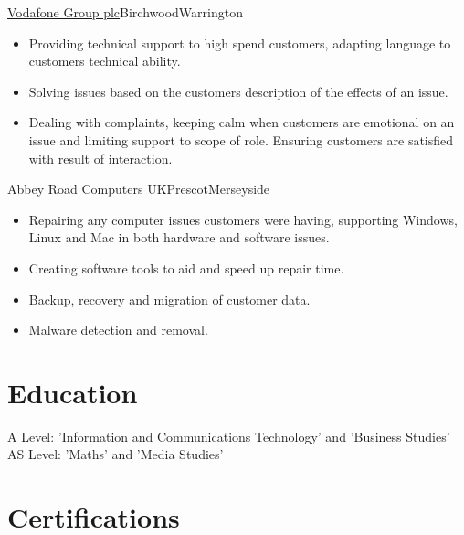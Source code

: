 \documentclass[a4paper,10pt]{moderncv}
\newcommand\weblink[2] {{\color{href} \href{#1}{#2}}}
\begin{document}
{\weblink{http://www.vodafone.com/}{Vodafone Group plc}}{Birchwood}{Warrington}{
\begin{itemize}
  \item Providing technical support to high spend customers, adapting language to customers technical ability.
  \item Solving issues based on the customers description of the effects of an issue.
  \item Dealing with complaints, keeping calm when customers are emotional on an issue and limiting support to scope of role. Ensuring customers are satisfied with result of interaction.
\end{itemize}
}

{Abbey Road Computers UK}{Prescot}{Merseyside}{
\begin{itemize}
  \item Repairing any computer issues customers were having, supporting Windows, Linux and Mac in both hardware and software issues.
  \item Creating software tools to aid and speed up repair time.
  \item Backup, recovery and migration of customer data.
  \item Malware detection and removal.
\end{itemize}
}

\section{Education}
{
A Level: 'Information and Communications Technology' and 'Business Studies'\\
AS Level: 'Maths' and 'Media Studies'
}

\section{Certifications}
\end{document}
